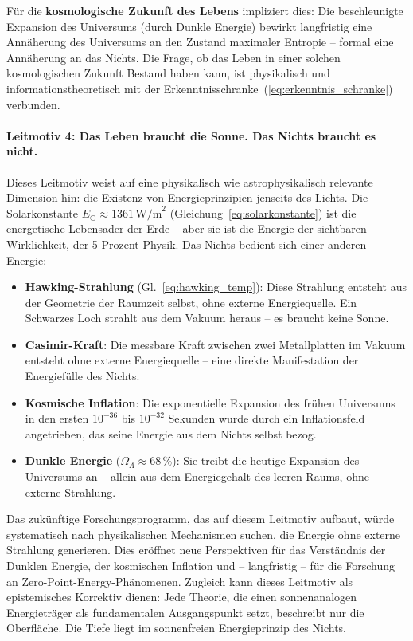 ﻿\documentclass[12pt,a4paper]{report}
\begin{document}
Für die \textbf{kosmologische Zukunft des Lebens} impliziert dies: Die beschleunigte Expansion des Universums (durch Dunkle Energie) bewirkt langfristig eine Annäherung des Universums an den Zustand maximaler Entropie -- formal eine Annäherung an das Nichts. Die Frage, ob das Leben in einer solchen kosmologischen Zukunft Bestand haben kann, ist physikalisch und informationstheoretisch mit der Erkenntnisschranke~(\ref{eq:erkenntnis_schranke}) verbunden.

\paragraph{Leitmotiv 4: Das Leben braucht die Sonne. Das Nichts braucht es nicht.}

Dieses Leitmotiv weist auf eine physikalisch wie astrophysikalisch relevante Dimension hin: die Existenz von Energieprinzipien jenseits des Lichts. Die Solarkonstante $E_{\odot} \approx 1361\,\text{W/m}^2$ (Gleichung~\ref{eq:solarkonstante}) ist die energetische Lebensader der Erde -- aber sie ist die Energie der sichtbaren Wirklichkeit, der 5-Prozent-Physik. Das Nichts bedient sich einer anderen Energie:

\begin{itemize}
	\item \textbf{Hawking-Strahlung} (Gl.~\ref{eq:hawking_temp}): Diese Strahlung entsteht aus der Geometrie der Raumzeit selbst, ohne externe Energiequelle. Ein Schwarzes Loch strahlt aus dem Vakuum heraus -- es braucht keine Sonne.
	\item \textbf{Casimir-Kraft}: Die messbare Kraft zwischen zwei Metallplatten im Vakuum entsteht ohne externe Energiequelle -- eine direkte Manifestation der Energiefülle des Nichts.
	\item \textbf{Kosmische Inflation}: Die exponentielle Expansion des frühen Universums in den ersten $10^{-36}$ bis $10^{-32}$ Sekunden wurde durch ein Inflationsfeld angetrieben, das seine Energie aus dem Nichts selbst bezog.
	\item \textbf{Dunkle Energie} ($\Omega_\Lambda \approx 68\,\%$): Sie treibt die heutige Expansion des Universums an -- allein aus dem Energiegehalt des leeren Raums, ohne externe Strahlung.
\end{itemize}

Das zukünftige Forschungsprogramm, das auf diesem Leitmotiv aufbaut, würde systematisch nach physikalischen Mechanismen suchen, die Energie ohne externe Strahlung generieren. Dies eröffnet neue Perspektiven für das Verständnis der Dunklen Energie, der kosmischen Inflation und -- langfristig -- für die Forschung an Zero-Point-Energy-Phänomenen. Zugleich kann dieses Leitmotiv als epistemisches Korrektiv dienen: Jede Theorie, die einen sonnenanalogen Energieträger als fundamentalen Ausgangspunkt setzt, beschreibt nur die Oberfläche. Die Tiefe liegt im sonnenfreien Energieprinzip des Nichts.
\end{document}
